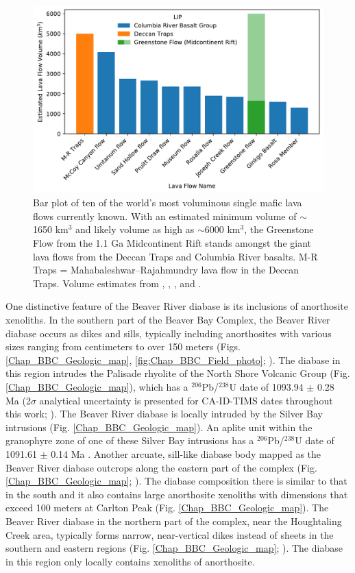 \begin{figure}[h!]
\noindent\includegraphics[width=\textwidth]{figure/Zhang2021/Lava_flow_rank.pdf}
\caption{\footnotesize{Bar plot of ten of the world's most voluminous single mafic lava flows currently known. With an estimated minimum volume of $\sim$1650 km$^3$ and likely volume as high as $\sim$6000 km$^3$, the Greenstone Flow from the 1.1 Ga Midcontinent Rift stands amongst the giant lava flows from the Deccan Traps and Columbia River basalts. M-R Traps = Mahabaleshwar--Rajahmundry lava flow in the Deccan Traps. Volume estimates from \cite{Self2008a}, \cite{Bryan2010a}, \cite{Longo1984a}, and \cite{Doyle2016a}.}}
\label{fig:lava_flow_rank}
\end{figure}

One distinctive feature of the Beaver River diabase is its inclusions of anorthosite xenoliths. In the southern part of the Beaver Bay Complex, the Beaver River diabase occurs as dikes and sills, typically including anorthosites with various sizes ranging from centimeters to over 150 meters (Figs. \ref{Chap_BBC_Geologic_map}, \ref{fig:Chap_BBC_Field_photo}; \cite{Grout1939a, Morrison1983a}). The diabase in this region intrudes the Palisade rhyolite of the North Shore Volcanic Group (Fig. \ref{Chap_BBC_Geologic_map}), which has a $^{206}$Pb/$^{238}$U date of 1093.94 $\pm$ 0.28 Ma (2$\sigma$ analytical uncertainty is presented for CA-ID-TIMS dates throughout this work; \cite{Swanson-Hysell2019a}). The Beaver River diabase is locally intruded by the Silver Bay intrusions (Fig. \ref{Chap_BBC_Geologic_map}). An aplite unit within the granophyre zone of one of these Silver Bay intrusions has a $^{206}$Pb/$^{238}$U date of 1091.61 $\pm$ 0.14 Ma \citep{Swanson-Hysell2019a}. Another arcuate, sill-like diabase body mapped as the Beaver River diabase outcrops along the eastern part of the complex (Fig. \ref{Chap_BBC_Geologic_map}; \cite{Miller1997a}). The diabase composition there is similar to that in the south and it also contains large anorthosite xenoliths with dimensions that exceed 100 meters at Carlton Peak (Fig. \ref{Chap_BBC_Geologic_map}). The Beaver River diabase in the northern part of the complex, near the Houghtaling Creek area, typically forms narrow, near-vertical dikes instead of sheets in the southern and eastern regions (Fig. \ref{Chap_BBC_Geologic_map}; \cite{Miller1994a}). The diabase in this region only locally contains xenoliths of anorthosite. 

